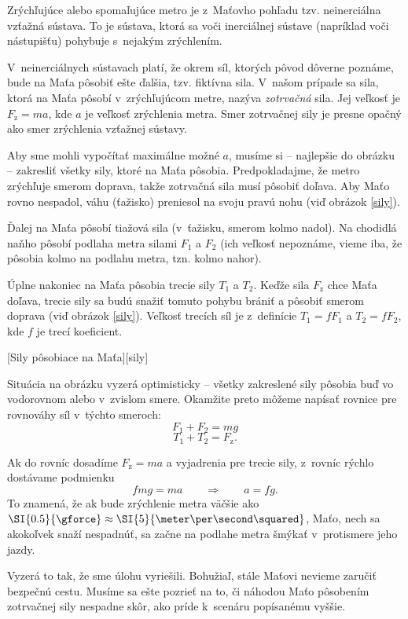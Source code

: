 Zrýchľujúce alebo spomaľujúce metro je z~Maťovho pohľadu tzv. neinerciálna vzťažná sústava.
To je sústava, ktorá sa voči inerciálnej sústave (napríklad voči nástupišťu) pohybuje s~nejakým zrýchlením.

V~neinerciálnych sústavach platí, že okrem síl, ktorých pôvod dôverne poznáme,
bude na Maťa pôsobiť ešte ďalšia, tzv. fiktívna sila. V~našom prípade sa sila, ktorá
na Maťa pôsobí v~zrýchľujúcom metre, nazýva \emph{zotrvačná} sila. Jej veľkosť
je $F_{\mathrm{z}} = ma$, kde $a$ je veľkosť zrýchlenia metra. Smer zotrvačnej sily je
presne opačný ako smer zrýchlenia vzťažnej sústavy.

Aby sme mohli vypočítať maximálne možné $a$, musíme si -- najlepšie do obrázku -- zakresliť
všetky sily, ktoré na Maťa pôsobia. Predpokladajme, že metro zrýchľuje smerom
doprava, takže zotrvačná sila musí pôsobiť doľava. Aby Maťo rovno nespadol,
váhu (ťažisko) preniesol na svoju pravú nohu (viď obrázok \ref{sily}).

Ďalej na Maťa pôsobí tiažová sila (v~ťažisku, smerom kolmo
nadol). Na chodidlá naňho pôsobí podlaha metra silami $F_1$ a $F_2$ (ich veľkosť
nepoznáme, vieme iba, že pôsobia kolmo na podlahu metra, tzn. kolmo nahor).

Úplne nakoniec na Maťa pôsobia trecie sily $T_1$ a $T_2$. Keďže sila $F_{\mathrm{z}}$ chce
Maťa  doľava, trecie sily sa budú snažiť tomuto pohybu brániť a pôsobiť
smerom doprava (viď obrázok \ref{sily}). Veľkosť trecích síl je
z~definície $T_1 = f F_1$ a $T_2 = f F_2$, kde $f$ je trecí koeficient.

[Sily pôsobiace na Maťa][sily]

Situácia na obrázku vyzerá optimisticky -- všetky zakreslené sily pôsobia
buď vo vodorovnom alebo v~zvislom smere. Okamžite preto môžeme napísať
rovnice pre rovnováhy síl v~týchto smeroch:
$$F_1 + F_2 = mg$$
$$T_1 + T_2 = F_{\mathrm{z}}\text{.}$$

Ak do rovníc dosadíme $F_{\mathrm{z}} = ma$ a vyjadrenia pre trecie sily, z~rovníc
rýchlo dostávame podmienku
$$
  f mg = ma \qquad\Rightarrow\qquad a = fg \text{.}
$$
To znamená, že ak bude zrýchlenie metra väčšie ako $\SI{0.5}{\gforce} \approx \SI{5}{\meter\per\second\squared}$, Maťo,
nech sa akokoľvek snaží nespadnúť, sa začne na podlahe metra šmýkať v~protismere
jeho jazdy.

Vyzerá to tak, že sme úlohu vyriešili. Bohužiaľ, stále Maťovi nevieme zaručiť
bezpečnú cestu. Musíme sa ešte pozrieť na to, či náhodou Maťo pôsobením
zotrvačnej sily nespadne skôr, ako príde k~scenáru popísanému vyššie.

